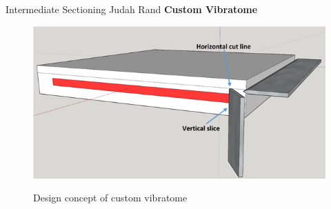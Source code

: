 \documentclass[10pt]{beamer}
\begin{document}
\begin{frame}{Intermediate Sectioning\hspace{0pt plus 1 filll} \small{Judah Rand}}
	\textbf{Custom Vibratome}
		\begin{figure}
			\centering
			\includegraphics[width=.8\paperwidth]{custom_vibratome}
			\caption \small Design concept of custom vibratome
		\end{figure}
\end{frame}
\end{document}
